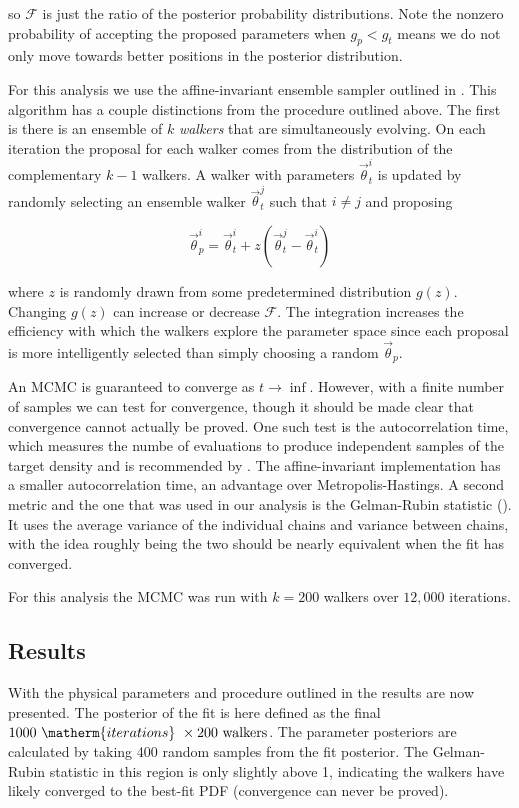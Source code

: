 \noindent so $\mathcal{F}$ is just the ratio of the posterior probability distributions.  Note the nonzero probability of accepting the
proposed parameters when $g_p < g_t$ means we do not only move towards better positions in the posterior distribution.

For this analysis we use the affine-invariant ensemble sampler outlined in .  This algorithm has a couple
distinctions from the procedure outlined above.  The first is there is an ensemble of $k$ \textit{walkers} that are simultaneously
evolving.  On each iteration the proposal for
each walker comes from the distribution of the complementary $k - 1$ walkers.  A walker with parameters $\overrightarrow{\theta}_{t}^i$
is updated by randomly selecting an ensemble walker $\overrightarrow{\theta}_{t}^j$ such that $i \neq j$ and proposing

\begin{equation}
\overrightarrow{\theta}_{p}^{i} = \overrightarrow{\theta}_{t}^{i} + z(\overrightarrow{\theta}_{t}^{j} - \overrightarrow{\theta}_{t}^{i})
\end{equation}

\noindent where $z$ is randomly drawn from some predetermined distribution $g(z)$.  Changing $g(z)$ can increase or decrease
$\mathcal{F}$.  The integration increases the efficiency with which the walkers explore the parameter space since each proposal is more
intelligently selected than simply choosing a random $\overrightarrow{\theta}_p$.

An MCMC is guaranteed to converge as $t \rightarrow \inf$.  However, with a finite number of samples we can test for convergence, though
it should be made clear that convergence cannot actually be proved.  One such test is the autocorrelation time, which measures the numbe
of evaluations to produce independent samples of the target density and is recommended by .  The affine-invariant
implementation has a smaller autocorrelation time, an advantage over Metropolis-Hastings.  A second metric and the one that was used in
our analysis is the Gelman-Rubin statistic ().  It uses the average variance of the individual chains and variance
between chains, with the idea roughly being the two should be nearly equivalent when the fit has converged.

For this analysis the MCMC was run with $k = 200$ walkers over $12,000$ iterations.



\subsection{Results}
\label{subsec:er_nr_calibrations_results}
With the physical parameters and procedure outlined in  the results are now
presented.  The posterior of the fit is here defined as the final $1000\ \matherm{iterations}\ \times 200\ \mathrm{walkers}$.  The
parameter posteriors are calculated by taking 400 random samples from the fit posterior.  The Gelman-Rubin statistic in this region is
only slightly above 1, indicating the walkers have likely converged to the best-fit PDF (convergence can never be proved).

